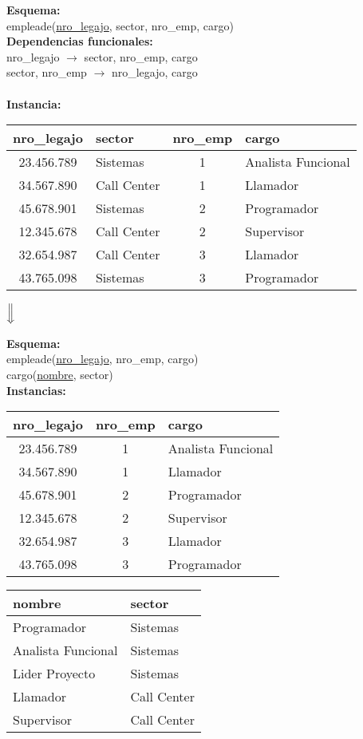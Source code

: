 \documentclass[preview]{standalone}
\begin{document}
\textbf{Esquema:}\\
empleade(\underline{nro\_legajo}, sector, nro\_emp, cargo)\\

\textbf{Dependencias funcionales:}\\
nro\_legajo $\rightarrow$ sector, nro\_emp, cargo\\
sector, nro\_emp $\rightarrow$ nro\_legajo, cargo\\
{\color{red}{cargo $\rightarrow$ sector}}\\

\textbf{Instancia:}
\begin{center}
\scriptsize
\begin{tabular}{| c | l | c | l |}\hline			
	nro\_legajo & sector & nro\_emp & cargo  \\\hline			
	23.456.789 & Sistemas & 1 & Analista Funcional \\
	34.567.890 & Call Center & 1 & Llamador \\
	45.678.901 & Sistemas & 2 & Programador \\
	12.345.678 & Call Center & 2 & Supervisor \\
	32.654.987 & Call Center & 3 & Llamador \\
	43.765.098 & Sistemas & 3 & Programador \\\hline
\end{tabular}



$\Big\Downarrow$
\end{center}

\textbf{Esquema:}\\
empleade(\underline{nro\_legajo}, nro\_emp, cargo)\\
cargo(\underline{nombre}, sector)\\

\textbf{Instancias:}
\begin{center}
\scriptsize
\begin{tabular}{| c | c | l |}\hline			
	nro\_legajo & nro\_emp & cargo  \\\hline			
	23.456.789 & 1 & Analista Funcional \\
	34.567.890 & 1 & Llamador \\
	45.678.901 & 2 & Programador \\
	12.345.678 & 2 & Supervisor \\
	32.654.987 & 3 & Llamador \\
	43.765.098 & 3 & Programador \\\hline
\end{tabular}
\quad
\begin{tabular}{| l | l |}\hline
	nombre & sector \\\hline
	Programador & Sistemas\\
	Analista Funcional & Sistemas\\
	Lider Proyecto & Sistemas\\
	Llamador & Call Center\\	
	Supervisor & Call Center\\\hline		
\end{tabular}
\end{center}
\end{document}
